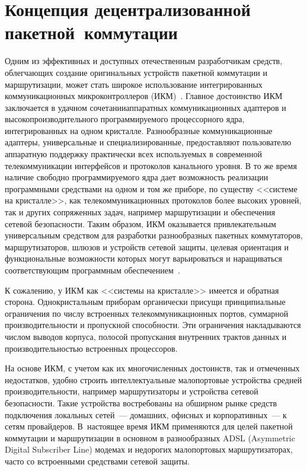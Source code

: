       \begin{multicols}{2}

      \label{st\stat}

\section{Концепция децентрализованной пакетной~коммутации}
     
     Одним из эффективных и доступных отечественным разработчикам средств, 
облегчающих создание оригинальных устройств пакетной коммутации и маршрутизации, 
может стать широкое использование интегрированных коммуникаци\-он\-ных 
микроконтроллеров (ИКМ)~\cite{1eg}. Главное достоинство ИКМ заключается в удачном 
сочетании\linebreak аппаратных коммуникационных адаптеров и высокопроизводительного 
программируемого процессорного ядра, интегрированных на одном кристалле. 
Разнообразные коммуникационные адаптеры, универсальные и специализированные, 
предос\-тав\-ля\-ют пользователю аппаратную поддержку практически всех используемых в 
современной телекоммуникации интерфейсов и протоколов канального уровня. В то же 
время наличие свободно программируемого ядра дает возможность реализации\linebreak 
программными средствами на одном и том же приборе, по существу <<системе на 
кристалле>>, как телекоммуникационных протоколов более высоких уровней, так и других 
сопряженных задач, например маршрутизации и обеспечения сетевой безопас\-ности. Таким 
образом, ИКМ оказывается привлекательным универсальным средством для разработки 
разнообразных пакетных коммутаторов, маршрутизаторов, шлюзов и устройств сетевой 
защиты, целевая ориентация и функциональные возможности которых могут варьироваться 
и наращиваться соответствующим программным обеспечением~\cite{2eg}.
     
     К сожалению, у ИКМ как <<системы на кристалле>> имеется и обратная сторона. 
Однокристальным приборам органически присущи принципиальные ограничения по числу 
встроенных телекоммуникационных портов, суммарной про\-из\-во\-ди\-тель\-ности и пропускной 
способности. Эти ограничения накладываются числом выводов корпуса, полосой 
пропускания внутренних трактов данных и производительностью встроенных процессоров. 

На основе ИКМ, с учетом как их многочисленных достоинств, так и отмеченных 
недостатков, удобно строить интеллектуальные малопортовые устройства средней 
производительности,\linebreak
 например маршрутизаторы и устройства сетевой без\-опас\-ности. Такие 
устройства востребованы на обширном рынке средств подключения локальных\linebreak
 сетей~--- 
домашних, офисных и корпоративных~--- к сетям провайдеров. В~настоящее время ИКМ 
применя\-ются для целей пакетной коммутации и маршрутизации в основном в 
разнообразных ADSL (Asymmetric Digital Subscriber Line) 
модемах и недорогих малопортовых маршрутизаторах, часто со 
встроенными средствами сетевой защиты.
     

\end{multicols}
